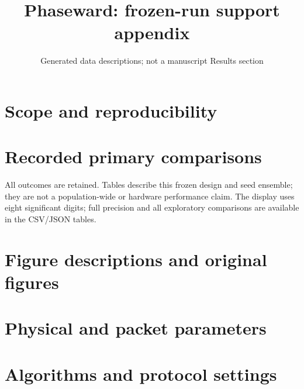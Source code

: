 \documentclass[10pt]{article}
\title{Phaseward: frozen-run support appendix}
\author{}
\date{Generated data descriptions; not a manuscript Results section}
\begin{document}
\maketitle
\section{Scope and reproducibility}

\section{Recorded primary comparisons}
All outcomes are retained. Tables describe this frozen design and seed ensemble;
they are not a population-wide or hardware performance claim. The display uses
eight significant digits; full precision and all exploratory comparisons are
available in the CSV/JSON tables.

\section{Figure descriptions and original figures}

\clearpage
\section{Physical and packet parameters}

\section{Algorithms and protocol settings}

\end{document}

